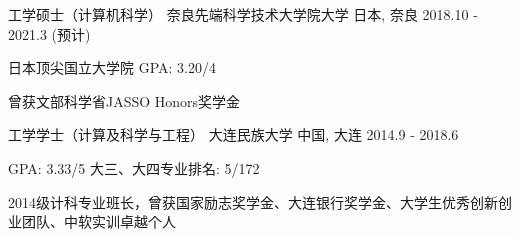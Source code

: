 
\begin{cventries}
 \cventry
    {工学硕士（计算机科学）} %
    {奈良先端科学技术大学院大学} %
    {日本, 奈良} %
    {2018.10 - 2021.3 (预计)} %
    {
      \begin{cvitems}
      \item {日本顶尖国立大学院 \quad GPA: 3.20/4}
      \item {曾获文部科学省JASSO Honors奖学金}%
      \end{cvitems}
    }

  \cventry
    {工学学士（计算及科学与工程）} %
    {大连民族大学} %
    {中国, 大连} %
    {2014.9 - 2018.6} %
    {
      \begin{cvitems} %
      \item {GPA: 3.33/5 \quad 大三、大四专业排名: 5/172}
      \item {2014级计科专业班长，曾获国家励志奖学金、大连银行奖学金、大学生优秀创新创业团队、中软实训卓越个人}
      \end{cvitems}
    }

\end{cventries}
